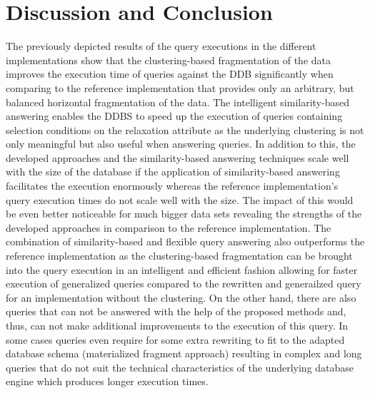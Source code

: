 
\section{Discussion and Conclusion}
\label{sec:disc}

The previously depicted results of the query executions in the different implementations show that the clustering-based fragmentation of the data improves the
execution time of queries against the DDB significantly when comparing to the reference implementation that provides only an arbitrary, but balanced horizontal
fragmentation of the data. The intelligent similarity-based answering enables the DDBS to speed up the execution of queries containing selection conditions on
the relaxation attribute as the underlying clustering is not only meaningful but also useful when answering queries. In addition to this, the developed approaches
and the similarity-based answering techniques scale well with the size of the database if the application of similarity-based answering facilitates the execution 
enormously whereas the reference implementation's query execution times do not scale well with the size. The impact of this would be even better noticeable for
much bigger data sets revealing the strengths of the developed approaches in comparison to the reference implementation. The combination of similarity-based and
flexible query answering also outperforms the reference implementation as the clustering-based fragmentation can be brought into the query execution in an 
intelligent and efficient fashion allowing for faster execution of generalized queries compared to the rewritten and generailzed query for an implementation
without the clustering. On the other hand, there are also queries that can not be answered with the help of the proposed methods and, thus, can not make additional
improvements to the execution of this query. In some cases queries even require for some extra rewriting to fit to the adapted database schema (materialized
fragment approach) resulting in complex and long queries that do not suit the technical characteristics of the underlying database engine which produces longer
execution times.


